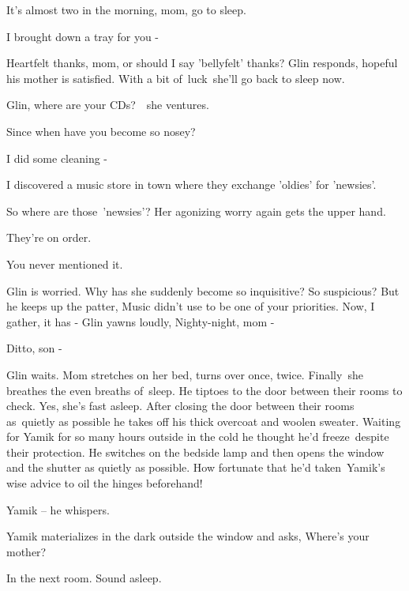 \documentclass[twoside,11pt]{book}
\begin{document}
{\textquotedbl}It's almost two in the morning, mom, go to sleep.{\textquotedbl} 

{\textquotedbl}I brought down a tray for you -{\textquotedbl} 

{\textquotedbl}Heartfelt thanks, mom, or should I say 'bellyfelt' thanks?{\textquotedbl} Glin responds, hopeful his
mother is satisfied. With a bit of\ luck\ she'll go back to sleep now.

{\textquotedbl}Glin, where are your CDs?{\textquotedbl}\ \ she ventures.

{\textquotedbl}Since when have you become so nosey?{\textquotedbl} 

{\textquotedbl}I did some cleaning -{\textquotedbl} 

{\textquotedbl}I discovered a music store in town where they exchange {}'oldies{}' for {}'newsies{}'.{\textquotedbl} 

{\textquotedbl}So where are those\ {}'newsies{}'?{\textquotedbl} Her agonizing worry again gets the upper hand.

{\textquotedbl}They're on order.{\textquotedbl} 

{\textquotedbl}You never mentioned it.{\textquotedbl} 

Glin is worried. Why has she suddenly become so inquisitive? So suspicious? But he keeps up the patter,
{\textquotedbl}Music didn't use to be one of your priorities. Now, I gather, it has -{\textquotedbl} Glin yawns
loudly{,} {\textquotedbl}Nighty-night, mom -{\textquotedbl} 

{\textquotedbl}Ditto, son -{\textquotedbl}

Glin waits. Mom stretches on her bed, turns over once, twice. Finally\ she breathes the even breaths of~sleep. He
tiptoes to the door between their rooms to check. Yes, she's fast asleep. After closing the door between their rooms
as~quietly as possible he takes off his thick overcoat and woolen sweater. Waiting for Yamik for so many hours outside
in the cold he thought he'd freeze\ despite their protection. He switches on the bedside lamp and then opens the window
and the shutter as quietly as possible. How fortunate that h{e}{}'d
taken{\ }Yamik's wise advice to oil the hinges beforehand!

 {\textquotedbl}Yamik --{\textquotedbl} he whispers.

Yamik materializes in the dark outside the window and asks, {\textquotedbl}Where's your mother?{\textquotedbl} 

{\textquotedbl}In the next room. Sound asleep.{\textquotedbl} 
\end{document}
